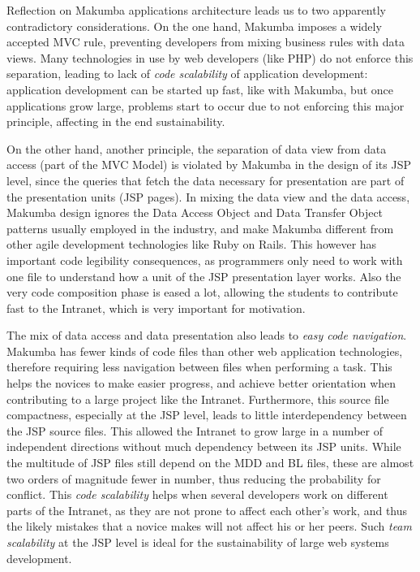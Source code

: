 \documentclass{chi2009}
\begin{document}
Reflection on Makumba applications architecture leads us to two apparently contradictory considerations. On the one hand, Makumba imposes a widely accepted MVC rule, preventing developers from mixing business rules with data views. Many technologies in use by web developers (like PHP) do not enforce this separation, leading to lack of \textit{code scalability} of application development: application development can be started up fast, like with Makumba, but once applications grow large, problems start to occur due to not enforcing this major principle, affecting in the end sustainability. %

On the other hand, another principle, the separation of data view from data access (part of the MVC Model) is violated by Makumba in the design of its JSP level, since the queries that fetch the data necessary for presentation are part of the presentation units (JSP pages). %
In mixing the data view and the data access, Makumba design ignores the Data Access Object and Data Transfer Object patterns usually employed in the industry, and make Makumba different from other agile development technologies like Ruby on Rails. This however has important code legibility consequences, as programmers only need to work with one file to understand how a unit of the JSP presentation layer works. Also the very code composition phase is eased a lot, allowing the students to contribute fast to the Intranet, which is very important for motivation. 

The mix of data access and data presentation also leads to \textit{easy code navigation}.  Makumba has fewer kinds of code files than other web application technologies, therefore requiring less navigation between files when performing a task. This helps the novices to make easier progress, and achieve better orientation when contributing to a large project like the Intranet. Furthermore, this source file compactness, especially at the JSP level, leads to little interdependency between the JSP source files. This allowed the Intranet to grow large in a number of independent directions without much dependency between its JSP units. While the multitude of JSP files still depend on the MDD and BL files, these are almost two orders of magnitude fewer in number, thus reducing the probability for conflict. This \textit{code scalability}  helps when several developers work on different parts of the Intranet, as they are not prone to affect each other's work, and thus the likely mistakes that a novice makes will not affect his or her peers. Such \textit{team scalability} at the JSP level is ideal for the sustainability of large web systems development.
\end{document}
